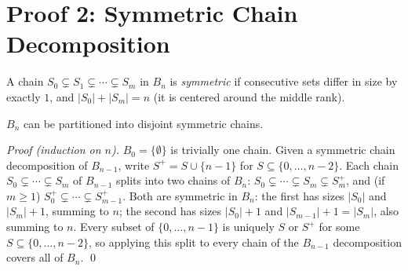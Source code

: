 \documentclass[11pt]{article}
\begin{document}
\section{Proof 2: Symmetric Chain Decomposition}
\begin{definitionbox}
A chain $S_0 \subsetneq S_1 \subsetneq \cdots \subsetneq S_m$ in $B_n$ is
\emph{symmetric} if consecutive sets differ in size by exactly $1$, and
$|S_0| + |S_m| = n$ (it is centered around the middle rank).
\end{definitionbox}

\begin{theorembox}
$B_n$ can be partitioned into disjoint symmetric chains.

\emph{Proof (induction on $n$).} $B_0 = \{\emptyset\}$ is trivially one
chain. Given a symmetric chain decomposition of $B_{n-1}$, write
$S^+ = S \cup \{n-1\}$ for $S \subseteq \{0,\ldots,n-2\}$. Each chain
$S_0 \subsetneq \cdots \subsetneq S_m$ of $B_{n-1}$ splits into two chains
of $B_n$: $S_0 \subsetneq \cdots \subsetneq S_m \subsetneq S_m^+$, and (if
$m \ge 1$) $S_0^+ \subsetneq \cdots \subsetneq S_{m-1}^+$. Both are
symmetric in $B_n$: the first has sizes $|S_0|$ and $|S_m|+1$, summing to
$n$; the second has sizes $|S_0|+1$ and $|S_{m-1}|+1 = |S_m|$, also
summing to $n$. Every subset of $\{0,\ldots,n-1\}$ is uniquely $S$ or
$S^+$ for some $S \subseteq \{0,\ldots,n-2\}$, so applying this split to
every chain of the $B_{n-1}$ decomposition covers all of $B_n$. \qed
\end{theorembox}
\end{document}
